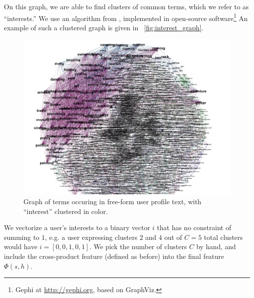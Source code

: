 On this graph, we are able to find clusters of common terms, which we refer to as ``interests.''
We use an algorithm from \cite{Blondel2008}, implemented in open-source software\footnote{Gephi at \url{http://gephi.org}, based on GraphViz.}
An example of such a clustered graph is given in ~\autoref{fig:interest_graph}.

\begin{figure}[ht]
\centering
\includegraphics[width=1\linewidth]{figures/interest_graph.png}
\caption{Graph of terms occuring in free-form user profile text, with ``interest'' clustered in color.}
\label{fig:interest_graph}
\end{figure}

We vectorize a user's interests to a binary vector $i$ that has no constraint of summing to $1$, e.g. a user expressing clusters $2$ and $4$ out of $C=5$ total clusters would have $i=[0,0,1,0,1]$.
We pick the number of clusters $C$ by hand, and include the cross-product feature (defined as before) into the final feature $\Phi(s,h)$.

